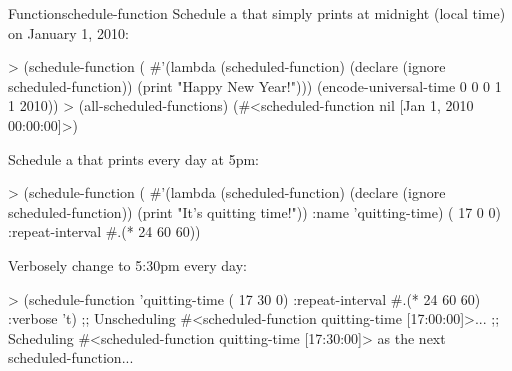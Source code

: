\begin{functiondoc}{Function}{schedule-function}
%
\fnexamples
Schedule a  that simply prints  
at midnight (local time) on January 1, 2010:
%
\W\supp
\begin{example}
> (schedule-function
    (
      #'(lambda (scheduled-function)
          (declare (ignore scheduled-function))
          (print "Happy New Year!")))
     (encode-universal-time 0 0 0 1 1 2010))
> (all-scheduled-functions)
(#<scheduled-function nil [Jan 1, 2010 00:00:00]>)
\end{example}
%
%
%
%
Schedule a  that prints  
every day at 5pm:
%
\W\supp\notpretop
\begin{example}
> (schedule-function
    (
      #'(lambda (scheduled-function)
          (declare (ignore scheduled-function))
          (print "It's quitting time!"))
      :name 'quitting-time)
     ( 17 0 0) :repeat-interval #.(* 24 60 60))
\end{example}
%
%
%
Verbosely change  to 5:30pm every day:
%
\W\supp\notpretop
\begin{example}
> (schedule-function 'quitting-time ( 17 30 0)
    :repeat-interval #.(* 24 60 60)
    :verbose 't)
;; Unscheduling #<scheduled-function quitting-time [17:00:00]>...
;; Scheduling #<scheduled-function quitting-time [17:30:00]> 
   as the next scheduled-function...
\end{example}

\end{functiondoc}


